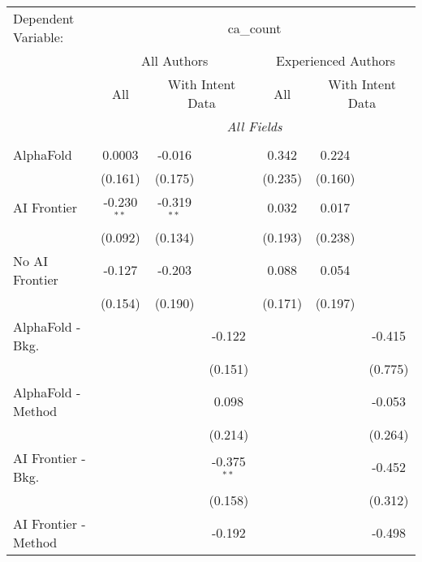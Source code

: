 \begingroup
\centering
\begin{tabular}{lcccccc}
   \tabularnewline \midrule \midrule
   Dependent Variable: & \multicolumn{6}{c}{ca\_count}\\
 & \multicolumn{3}{c}{All Authors} & \multicolumn{3}{c}{Experienced Authors} \\
\cmidrule(lr){2-4} \cmidrule(lr){5-7}
 & \multicolumn{1}{c}{All} & \multicolumn{2}{c}{With Intent Data} & \multicolumn{1}{c}{All} & \multicolumn{2}{c}{With Intent Data} \\
\cmidrule(lr){2-2} \cmidrule(lr){3-4} \cmidrule(lr){5-5} \cmidrule(lr){6-7}
 & \multicolumn{6}{c}{\textit{All Fields}} \\ \\
   AlphaFold               & 0.0003        & -0.016        &               & 0.342   & 0.224   &   \\   
                           & (0.161)       & (0.175)       &               & (0.235) & (0.160) &   \\   
   AI Frontier             & -0.230$^{**}$ & -0.319$^{**}$ &               & 0.032   & 0.017   &   \\   
                           & (0.092)       & (0.134)       &               & (0.193) & (0.238) &   \\   
   No AI Frontier          & -0.127        & -0.203        &               & 0.088   & 0.054   &   \\   
                           & (0.154)       & (0.190)       &               & (0.171) & (0.197) &   \\   
   AlphaFold - Bkg.        &               &               & -0.122        &         &         & -0.415\\   
                           &               &               & (0.151)       &         &         & (0.775)\\   
   AlphaFold - Method      &               &               & 0.098         &         &         & -0.053\\   
                           &               &               & (0.214)       &         &         & (0.264)\\   
   AI Frontier - Bkg.      &               &               & -0.375$^{**}$ &         &         & -0.452\\   
                           &               &               & (0.158)       &         &         & (0.312)\\   
   AI Frontier - Method    &               &               & -0.192        &         &         & -0.498\\   

\end{tabular}
